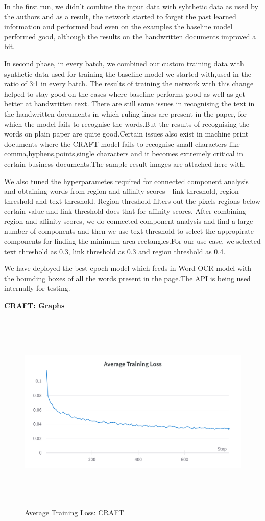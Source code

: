 In the first run, we didn't combine the input data with syhthetic data as used by the authors and as a result, the network started to forget the past learned information and performed bad even on the examples the baseline model performed good, although the results on the handwritten documents improved a bit.

In second phase, in every batch, we combined our custom training data with synthetic data used for training the baseline model we started with,used in the ratio of 3:1 in every batch. The results of training the network with this change helped to stay good on the cases where baseline performs good as well as get better at handwritten text. There are still some issues in recognising the text in the handwritten documents in which ruling lines are present in the paper, for which the model fails to recognise the words.But the results of recognising the words on plain paper are quite good.Certain issues also exist in machine print documents where the CRAFT model fails to recognise small characters like comma,hyphens,points,single characters and it becomes extremely critical in certain business documents.The sample result images are attached here with. 

We also tuned the hyperparametes required for connected component analysis and obtaining words from region and affinity scores - link threshold, region threshold and text threshold. Region threshold filters out the pixels regions below certain value and link threshold does that for affinity scores. After combining region and affinity scores, we do connected component analysis and find a large number of components and then we use text threshold to select the appropirate components for finding the minimum area rectangles.For our use case, we selected text threshold as 0.3, link threshold as 0.3 and region threshold as 0.4.

We have deployed the best epoch model which feeds in Word OCR model with the bounding boxes of all the words present in the page.The API is being used internally for testing. 

{\Large  \textbf{CRAFT: Graphs}}

\begin{figure}[H]
	\includegraphics[width=475pt,height=275pt]{Training Loss CRAFT.png}
	\caption{Average Training Loss: CRAFT}
\end{figure}

